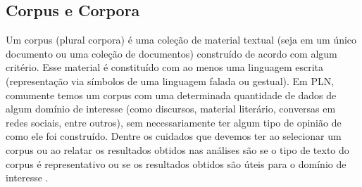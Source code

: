 \documentclass{automatextcc}
\begin{document}


\subsection{Corpus e Corpora}
Um corpus (plural corpora) é uma coleção de material textual (seja em um único documento ou uma coleção de documentos) construído de acordo com algum critério. Esse material é constituído com ao menos uma linguagem escrita (representação via símbolos de uma linguagem falada ou gestual). Em PLN, comumente temos um corpus com uma determinada quantidade de dados de algum domínio de interesse (como discursos, material literário, conversas em redes sociais, entre outros), sem necessariamente ter algum tipo de opinião de como ele foi construído. Dentre os cuidados que devemos ter ao selecionar um corpus ou ao relatar os resultados obtidos nas análises são se o tipo de texto do corpus é representativo ou se os resultados obtidos são úteis para o domínio de interesse \citep{manning1999, kamath2019}.
\end{document}
